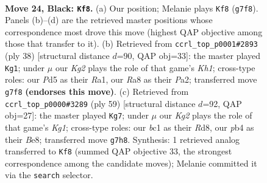 \documentclass[11pt]{article}
\begin{document}
\clearpage

\begin{figure}[p]\centering
\begin{subfigure}{0.46\textwidth}\centering
\resizebox{\linewidth}{!}{%
\newchessgame
\chessboard[
  setfen={rnr5/pppbb1k1/q4p2/P2p1N2/1P1P4/4P1P1/3Q4/RNB2RK1 b - - 0 24},
  showmover=false,
  pgfstyle=straightmove, color=movearrow, markmove={g7-f8}
]}
\caption{}
\end{subfigure}\hfill
\begin{subfigure}{0.46\textwidth}\centering
\resizebox{\linewidth}{!}{%
\newchessgame
\chessboard[
  setfen={r2qr1k1/1p3ppp/4bn2/p2p4/3Q4/3P1B2/PPP1NRPP/R6K w - - 0 20},
  showmover=false,
  pgfstyle=straightmove, color=movearrow, markmove={h1-g1}
]}
\caption{}
\end{subfigure}
\\[4pt]
\begin{subfigure}{0.46\textwidth}\centering
\resizebox{\linewidth}{!}{%
\newchessgame
\chessboard[
  setfen={3rb1k1/r6p/pp1q4/1n4pB/1P1p4/3N2P1/Q2RPP1P/2R3K1 b - - 3 30},
  showmover=false,
  pgfstyle=straightmove, color=movearrow, markmove={g8-g7}
]}
\caption{}
\end{subfigure}\hfill

\caption{\textbf{Move 24, Black: \texttt{Kf8}.} (a) Our position; Melanie plays \texttt{Kf8} (\texttt{g7f8}). Panels (b)--(d) are the retrieved master positions whose correspondence most drove this move (highest QAP objective among those that transfer to it). (b) Retrieved from \texttt{ccrl\_top\_p0001\#2893} (ply 38) [structural distance $d$=90, QAP obj=33]: the master played \texttt{Kg1}; under $\mu$ our \emph{Kg2} plays the role of that game's \emph{Kh1}; cross-type roles: our \emph{P}d5 as their \emph{R}a1, our \emph{R}a8 as their \emph{P}a2; transferred move \texttt{g7f8} \textbf{(endorses this move)}. (c) Retrieved from \texttt{ccrl\_top\_p0000\#3289} (ply 59) [structural distance $d$=92, QAP obj=27]: the master played \texttt{Kg7}; under $\mu$ our \emph{Kg2} plays the role of that game's \emph{Kg1}; cross-type roles: our \emph{b}c1 as their \emph{R}d8, our \emph{p}b4 as their \emph{B}e8; transferred move \texttt{g7h8}. Synthesis: 1 retrieved analog transferred to \texttt{Kf8} (summed QAP objective 33, the strongest correspondence among the candidate moves); Melanie committed it via the \texttt{search} selector.}
\label{fig:thought-m47}
\end{figure}

\clearpage
\end{document}
